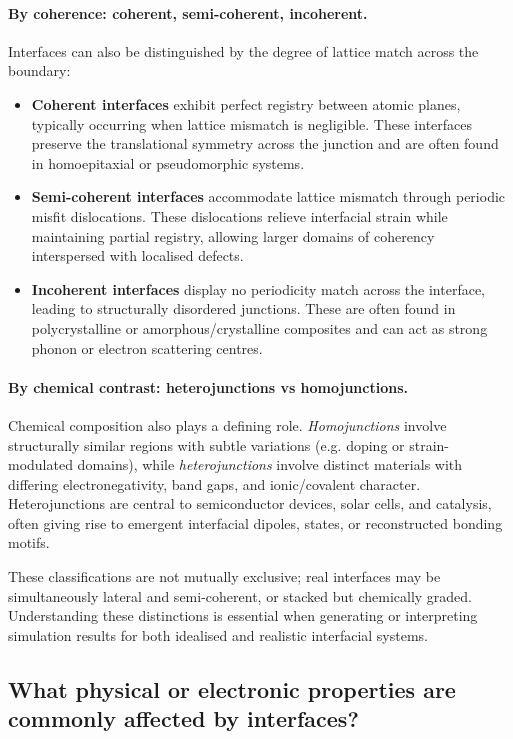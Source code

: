 \paragraph{By coherence: coherent, semi-coherent, incoherent.} Interfaces can also be distinguished by the degree of lattice match across the boundary: 
 
\begin{itemize}
    \item \textbf{Coherent interfaces} exhibit perfect registry between atomic planes, typically occurring when lattice mismatch is negligible. These interfaces preserve the translational symmetry across the junction and are often found in homoepitaxial or pseudomorphic systems.
    \item \textbf{Semi-coherent interfaces} accommodate lattice mismatch through periodic misfit dislocations. These dislocations relieve interfacial strain while maintaining partial registry, allowing larger domains of coherency interspersed with localised defects.
    \item \textbf{Incoherent interfaces} display no periodicity match across the interface, leading to structurally disordered junctions. These are often found in polycrystalline or amorphous/crystalline composites and can act as strong phonon or electron scattering centres.
\end{itemize} 
 
\paragraph{By chemical contrast: heterojunctions vs homojunctions.} Chemical composition also plays a defining role. \emph{Homojunctions} involve structurally similar regions with subtle variations (e.g. doping or strain-modulated domains), while \emph{heterojunctions} involve distinct materials with differing electronegativity, band gaps, and ionic/covalent character. Heterojunctions are central to semiconductor devices, solar cells, and catalysis, often giving rise to emergent interfacial dipoles, states, or reconstructed bonding motifs. 
 
These classifications are not mutually exclusive; real interfaces may be simultaneously lateral and semi-coherent, or stacked but chemically graded. Understanding these distinctions is essential when generating or interpreting simulation results for both idealised and realistic interfacial systems. 
 
\subsection{What physical or electronic properties are commonly affected by interfaces?} 
 
